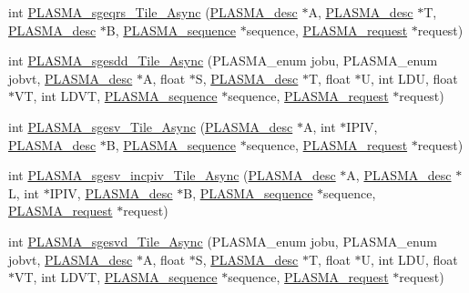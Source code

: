\begin{DoxyCompactItemize}
\item 
int \hyperlink{group__float__Tile__Async_ga481b8b15be614dc287fb42b0f6a71141_ga481b8b15be614dc287fb42b0f6a71141}{P\+L\+A\+S\+M\+A\+\_\+sgeqrs\+\_\+\+Tile\+\_\+\+Async} (\hyperlink{structplasma__desc__t}{P\+L\+A\+S\+M\+A\+\_\+desc} $\ast$A, \hyperlink{structplasma__desc__t}{P\+L\+A\+S\+M\+A\+\_\+desc} $\ast$T, \hyperlink{structplasma__desc__t}{P\+L\+A\+S\+M\+A\+\_\+desc} $\ast$B, \hyperlink{structplasma__sequence__t}{P\+L\+A\+S\+M\+A\+\_\+sequence} $\ast$sequence, \hyperlink{structplasma__request__t}{P\+L\+A\+S\+M\+A\+\_\+request} $\ast$request)
\item 
int \hyperlink{group__float__Tile__Async_ga31cc8a5cc51ffb0ad6f46c39711392b3_ga31cc8a5cc51ffb0ad6f46c39711392b3}{P\+L\+A\+S\+M\+A\+\_\+sgesdd\+\_\+\+Tile\+\_\+\+Async} (P\+L\+A\+S\+M\+A\+\_\+enum jobu, P\+L\+A\+S\+M\+A\+\_\+enum jobvt, \hyperlink{structplasma__desc__t}{P\+L\+A\+S\+M\+A\+\_\+desc} $\ast$A, float $\ast$S, \hyperlink{structplasma__desc__t}{P\+L\+A\+S\+M\+A\+\_\+desc} $\ast$T, float $\ast$U, int L\+D\+U, float $\ast$V\+T, int L\+D\+V\+T, \hyperlink{structplasma__sequence__t}{P\+L\+A\+S\+M\+A\+\_\+sequence} $\ast$sequence, \hyperlink{structplasma__request__t}{P\+L\+A\+S\+M\+A\+\_\+request} $\ast$request)
\item 
int \hyperlink{group__float__Tile__Async_ga1a8bb4c4851dd9c4221070eb655286df_ga1a8bb4c4851dd9c4221070eb655286df}{P\+L\+A\+S\+M\+A\+\_\+sgesv\+\_\+\+Tile\+\_\+\+Async} (\hyperlink{structplasma__desc__t}{P\+L\+A\+S\+M\+A\+\_\+desc} $\ast$A, int $\ast$I\+P\+I\+V, \hyperlink{structplasma__desc__t}{P\+L\+A\+S\+M\+A\+\_\+desc} $\ast$B, \hyperlink{structplasma__sequence__t}{P\+L\+A\+S\+M\+A\+\_\+sequence} $\ast$sequence, \hyperlink{structplasma__request__t}{P\+L\+A\+S\+M\+A\+\_\+request} $\ast$request)
\item 
int \hyperlink{group__float__Tile__Async_ga2d26ce9c7cee9f0eb59542bbc88c3ede_ga2d26ce9c7cee9f0eb59542bbc88c3ede}{P\+L\+A\+S\+M\+A\+\_\+sgesv\+\_\+incpiv\+\_\+\+Tile\+\_\+\+Async} (\hyperlink{structplasma__desc__t}{P\+L\+A\+S\+M\+A\+\_\+desc} $\ast$A, \hyperlink{structplasma__desc__t}{P\+L\+A\+S\+M\+A\+\_\+desc} $\ast$L, int $\ast$I\+P\+I\+V, \hyperlink{structplasma__desc__t}{P\+L\+A\+S\+M\+A\+\_\+desc} $\ast$B, \hyperlink{structplasma__sequence__t}{P\+L\+A\+S\+M\+A\+\_\+sequence} $\ast$sequence, \hyperlink{structplasma__request__t}{P\+L\+A\+S\+M\+A\+\_\+request} $\ast$request)
\item 
int \hyperlink{group__float__Tile__Async_gaf68d5ffa5f54c50e76e4ce08b1bbe413_gaf68d5ffa5f54c50e76e4ce08b1bbe413}{P\+L\+A\+S\+M\+A\+\_\+sgesvd\+\_\+\+Tile\+\_\+\+Async} (P\+L\+A\+S\+M\+A\+\_\+enum jobu, P\+L\+A\+S\+M\+A\+\_\+enum jobvt, \hyperlink{structplasma__desc__t}{P\+L\+A\+S\+M\+A\+\_\+desc} $\ast$A, float $\ast$S, \hyperlink{structplasma__desc__t}{P\+L\+A\+S\+M\+A\+\_\+desc} $\ast$T, float $\ast$U, int L\+D\+U, float $\ast$V\+T, int L\+D\+V\+T, \hyperlink{structplasma__sequence__t}{P\+L\+A\+S\+M\+A\+\_\+sequence} $\ast$sequence, \hyperlink{structplasma__request__t}{P\+L\+A\+S\+M\+A\+\_\+request} $\ast$request)

\end{DoxyCompactItemize}
